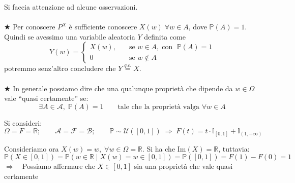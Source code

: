 \bigskip
\noindent Si faccia attenzione ad alcune osservazioni.\\
\\
\(\bigstar\) Per conoscere $P^X$ è sufficiente conoscere $X(w)\;\forall w\in A$, dove $\mathbb{P}(A)=1$.\\
Quindi se avessimo una variabile aleatoria $Y$ definita come
\[Y(w) = \begin{cases}
    X(w), \quad &\text{se } w\in A, \;\text{con }\;\mathbb{P}(A)=1\\
    0 &\text{se }w \notin A
\end{cases}\]
potremmo senz'altro concludere che $Y\overset{q.c.}{=}X$.\\
\\
\(\bigstar\) In generale possiamo dire che una qualunque proprietà che dipende da $w\in\Omega$ vale ``quasi certamente'' se: 
\[\exists A\in\mathcal{A}, \;\mathbb{P}(A)=1\qquad\text{tale che la proprietà valga }\forall w \in A\]
\begin{esempio}
    Si consideri:
    \[\Omega=F=\mathbb{R};\qquad \mathcal{A}=\mathcal{F} = \mathcal{B};\qquad \mathbb{P}\sim \mathcal{U}([0, 1])\;\Rightarrow\;F(t) = t\cdot \mathbb{I}_{[0, 1]} + \mathbb{I}_{(1, +\infty)}\]


    Consideriamo ora $X(w)=w, \; \forall w\in \Omega = \mathbb{R}$. Si ha che $\text{Im}(X) = \mathbb{R}$, tuttavia:
    \[\mathbb{P}(X\in [0, 1]) = \mathbb{P}(w\in\mathbb{R}\mid X(w) = w\in[0, 1]) = \mathbb{P}([0, 1]) = F(1) - F(0) = 1\]
    $\Rightarrow\quad$Possiamo affermare che $X\in[0, 1]$ sia una proprietà che vale quasi certamente
\end{esempio}



